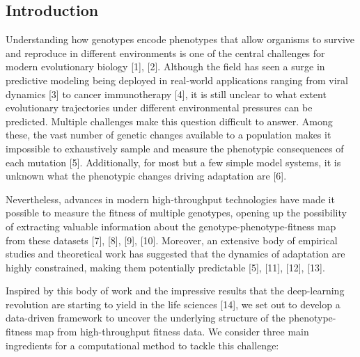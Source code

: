 \documentclass[
]{scrartcl}
\begin{document}
\begin{refsegment}

\section{Introduction}\label{introduction}

Understanding how genotypes encode phenotypes that allow organisms to
survive and reproduce in different environments is one of the central
challenges for modern evolutionary biology {[}1{]}, {[}2{]}. Although
the field has seen a surge in predictive modeling being deployed in
real-world applications ranging from viral dynamics {[}3{]} to cancer
immunotherapy {[}4{]}, it is still unclear to what extent evolutionary
trajectories under different environmental pressures can be predicted.
Multiple challenges make this question difficult to answer. Among these,
the vast number of genetic changes available to a population makes it
impossible to exhaustively sample and measure the phenotypic
consequences of each mutation {[}5{]}. Additionally, for most but a few
simple model systems, it is unknown what the phenotypic changes driving
adaptation are {[}6{]}.

Nevertheless, advances in modern high-throughput technologies have made
it possible to measure the fitness of multiple genotypes, opening up the
possibility of extracting valuable information about the
genotype-phenotype-fitness map from these datasets {[}7{]}, {[}8{]},
{[}9{]}, {[}10{]}. Moreover, an extensive body of empirical studies and
theoretical work has suggested that the dynamics of adaptation are
highly constrained, making them potentially predictable {[}5{]},
{[}11{]}, {[}12{]}, {[}13{]}.

Inspired by this body of work and the impressive results that the
deep-learning revolution are starting to yield in the life sciences
{[}14{]}, we set out to develop a data-driven framework to uncover the
underlying structure of the phenotype-fitness map from high-throughput
fitness data. We consider three main ingredients for a computational
method to tackle this challenge:


\end{refsegment}
\end{document}
